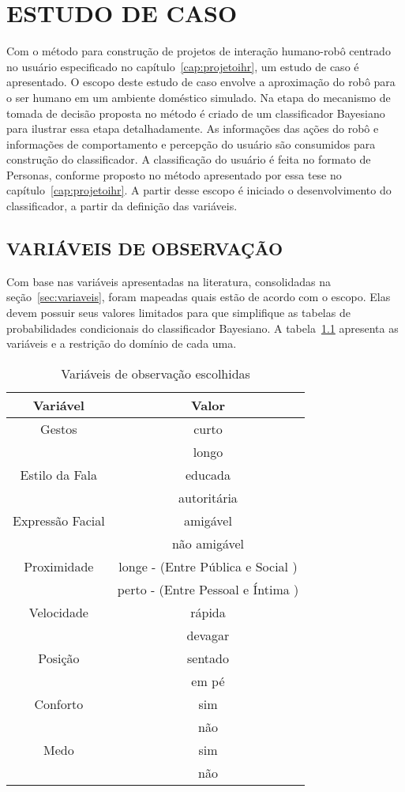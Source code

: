 \chapter{ESTUDO DE CASO}
\label{cap:estudocaso}
Com o método para construção de projetos de interação humano-robô centrado no usuário especificado no capítulo~\ref{cap:projetoihr}, um estudo de caso é apresentado. O escopo deste estudo de caso envolve a aproximação do robô para o ser humano em um ambiente doméstico simulado. Na etapa do mecanismo de tomada de decisão proposta no método é criado de um classificador Bayesiano para ilustrar essa etapa detalhadamente. As informações das ações do robô e informações de comportamento e percepção do usuário são consumidos para construção do classificador. A classificação do usuário é feita no formato de Personas, conforme proposto no método apresentado por essa tese no capítulo~\ref{cap:projetoihr}. A partir desse escopo é iniciado o desenvolvimento do classificador, a partir da definição das variáveis.

\section{VARIÁVEIS DE OBSERVAÇÃO}
\label{sec:ec_variaveis}
Com base nas variáveis apresentadas na literatura, consolidadas na seção~\ref{sec:variaveis}, foram mapeadas quais estão de acordo com o escopo. Elas devem possuir seus valores limitados para que simplifique as tabelas de probabilidades condicionais do classificador Bayesiano. A tabela~\ref{tab:variaveisvalores} apresenta as variáveis e a restrição do domínio de cada uma. 

\begin{table}[!ht]
	\caption{Variáveis de observação escolhidas}
	\label{tab:variaveisvalores}
	\centering
	\begin{tabular}{c | c}
		\hline
		Variável & Valor \\
		\hline
		Gestos & curto \\
		& longo \\
		\hline
		Estilo da Fala & educada \\
		& autoritária \\
		\hline
		Expressão Facial & amigável \\
		& não amigável \\
		\hline
		Proximidade & longe - (Entre Pública e Social ) \\
		& perto - (Entre Pessoal e Íntima ) \\
		\hline
		Velocidade & rápida \\
		& devagar \\
		\hline
		Posição & sentado \\
		& em pé \\
		\hline
		Conforto & sim \\
		& não \\
		\hline
		Medo & sim \\
		& não \\
		\hline
	\end{tabular}
\end{table}

